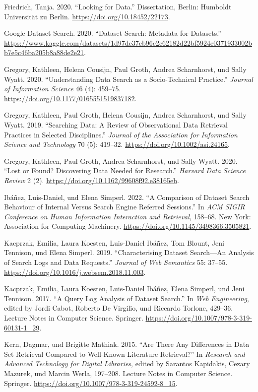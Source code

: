 \documentclass[a4paper,
fontsize=11pt,
oneside,
numbers=noperiodatend,
parskip=half-,
bibliography=totoc,
final
]{scrartcl}
\begin{document}
Friedrich, Tanja. 2020. \enquote{Looking for Data.} Dissertation,
Berlin: Humboldt Universität zu Berlin.
\url{https://doi.org/10.18452/22173}.

Google Dataset Search. 2020. \enquote{Dataset Search: Metadata for
Datasets.}
\url{https://www.kaggle.com/datasets/1d97de37cb96c2c62182d22bf5924e0371933002bb7e5c46ba205b8a88de2e21}.

Gregory, Kathleen, Helena Cousijn, Paul Groth, Andrea Scharnhorst, und
Sally Wyatt. 2020. \enquote{Understanding Data Search as a
Socio-Technical Practice.} \emph{Journal of Information Science} 46 (4):
459--75. \url{https://doi.org/10.1177/0165551519837182}.

Gregory, Kathleen, Paul Groth, Helena Cousijn, Andrea Scharnhorst, und
Sally Wyatt. 2019. \enquote{Searching Data: A Review of Observational
Data Retrieval Practices in Selected Disciplines.} \emph{Journal of the
Association for Information Science and Technology} 70 (5): 419--32.
\url{https://doi.org/10.1002/asi.24165}.

Gregory, Kathleen, Paul Groth, Andrea Scharnhorst, und Sally Wyatt.
2020. \enquote{Lost or Found? Discovering Data Needed for Research.}
\emph{Harvard Data Science Review} 2 (2).
\url{https://doi.org/10.1162/99608f92.e38165eb}.

Ibáñez, Luis-Daniel, und Elena Simperl. 2022. \enquote{A Comparison of
Dataset Search Behaviour of Internal Versus Search Engine Referred
Sessions.} In \emph{ACM SIGIR Conference on Human Information
Interaction and Retrieval}, 158--68. New York: Association for Computing
Machinery. \url{https://doi.org/10.1145/3498366.3505821}.

Kacprzak, Emilia, Laura Koesten, Luis-Daniel Ibáñez, Tom Blount, Jeni
Tennison, und Elena Simperl. 2019. \enquote{Characterising Dataset
Search---An Analysis of Search Logs and Data Requests.} \emph{Journal of
Web Semantics} 55: 37--55.
\url{https://doi.org/10.1016/j.websem.2018.11.003}.

Kacprzak, Emilia, Laura Koesten, Luis-Daniel Ibáñez, Elena Simperl, und
Jeni Tennison. 2017. \enquote{A Query Log Analysis of Dataset Search.}
In \emph{Web Engineering}, edited by Jordi Cabot, Roberto De Virgilio,
und Riccardo Torlone, 429--36. Lecture Notes in Computer Science.
Springer. \url{https://doi.org/10.1007/978-3-319-60131-1_29}.

Kern, Dagmar, und Brigitte Mathiak. 2015. \enquote{Are There Any
Differences in Data Set Retrieval Compared to Well-Known Literature
Retrieval?} In \emph{Research and Advanced Technology for Digital
Libraries}, edited by Sarantos Kapidakis, Cezary Mazurek, und Marcin
Werla, 197--208. Lecture Notes in Computer Science. Springer.
\url{https://doi.org/10.1007/978-3-319-24592-8_15}.
\end{document}
